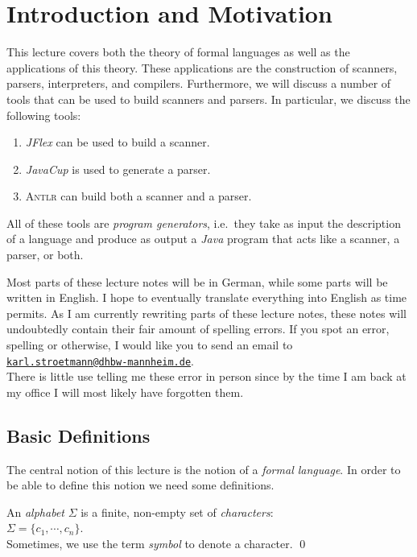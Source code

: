 \chapter{Introduction and Motivation}
This lecture covers both the theory of formal languages as well as the applications of this theory.
These applications are the construction of scanners, parsers, interpreters, and compilers.  Furthermore, we
will discuss a number of tools that can be used to build scanners and parsers.  In particular, we
discuss the following tools:
\begin{enumerate}
\item \textsl{JFlex} can be used to build a scanner.
\item \textsl{JavaCup} is used to generate a parser.
\item \textsc{Antlr} can build both a scanner and a parser.
\end{enumerate}
All of these tools are \emph{program generators}, i.e.~they take as input the description of a
language and produce as output a \textsl{Java} program that acts like a scanner, a parser, or both. 

Most parts of these lecture notes will be in German, while some parts will be written in English.
I hope to eventually translate everything into English as time permits.  As I am currently rewriting
parts of these lecture notes, these notes will undoubtedly contain their fair amount of spelling
errors.  If you spot an error, spelling or otherwise, I would like you to send an email to
\\[0.2cm]
\hspace*{1.3cm}
\href{mailto:karl.stroetmann@dhbw-mannheim.de}{\texttt{karl.stroetmann@dhbw-mannheim.de}}.
\\[0.2cm]
There is little use telling me these error in person since by the time I am back at my office I will
most likely have forgotten them.


\section{Basic Definitions}
The central notion of this lecture is the notion of a \emph{formal language}.
In order to be able to define this notion we need some definitions. 


\begin{Definition}[Alphabet]
An \emph{alphabet} $\Sigma$ is a finite, non-empty set of \emph{characters}:
\\[0.2cm]
\hspace*{1.3cm}
$\Sigma = \{ c_1, \cdots, c_n \}$. 
\\[0.2cm]
Sometimes, we use the term \emph{symbol} to denote a character.
\qed
\end{Definition}


